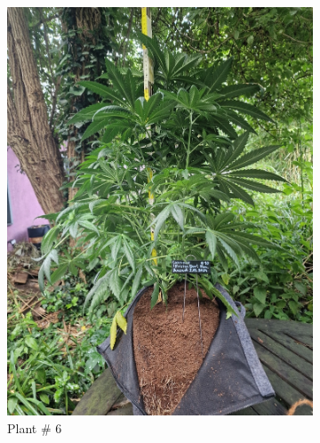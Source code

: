 \begin{figure}[htbp]
\begin{subfigure}[t]{.28\textwidth}
        \includegraphics[width=\linewidth]{plant_06_2024-06-17}
        \caption{Plant \# 6}
        \label{fig:plant_06_2024-06-17}
    \end{subfigure}
    \begin{subfigure}[t]{.28\textwidth}

\end{subfigure}
\end{figure}
